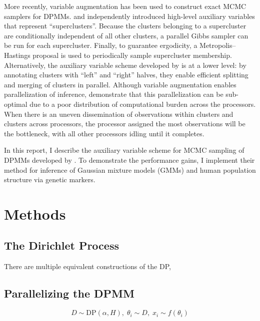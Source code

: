 \documentclass{uwstat572}
\begin{document}
More recently, variable augmentation has been used to construct exact MCMC samplers for DPMMs.
\citet{WDX13} and \citet{Lov+13} independently introduced high-level auxiliary variables that represent ``superclusters''.
Because the clusters belonging to a supercluster are conditionally independent of all other clusters, a parallel Gibbs sampler can be run for each supercluster.
Finally, to guarantee ergodicity, a Metropolis--Hastings proposal is used to periodically sample supercluster membership.
Alternatively, the auxiliary variable scheme developed by \citet{CF13,CF14} is at a lower level: by annotating clusters with ``left'' and ``right'' halves, they enable efficient splitting and merging of clusters in parallel.
Although variable augmentation enables parallelization of inference, \citet{GG14} demonstrate that this parallelization can be sub-optimal due to a poor distribution of computational burden across the processors.
When there is an uneven dissemination of observations within clusters and clusters across processors, the processor assigned the most observations will be the bottleneck, with all other processors idling until it completes.

In this report, I describe the auxiliary variable scheme for MCMC sampling of DPMMs developed by \citet{WDX13}.
To demonstrate the performance gains, I implement their method for inference of Gaussian mixture models (GMMs) and human population structure via genetic markers.

\section{Methods}



\subsection{The Dirichlet Process}


There are multiple equivalent constructions of the DP,

\subsection{Parallelizing the DPMM}

\begin{equation}
  D \sim \text{DP}\left(\alpha, H\right),\;
  \theta_i \sim D, \;
  x_i \sim f\left(\theta_i\right)
\end{equation}
\end{document}
